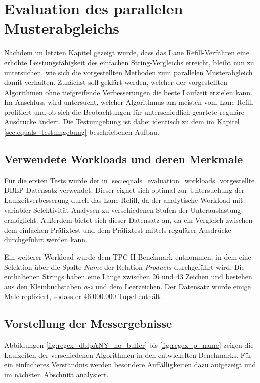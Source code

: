 \chapter{Evaluation des parallelen Musterabgleichs}

Nachdem im letzten Kapitel gezeigt wurde, dass das Lane Refill-Verfahren eine erhöhte Leistungsfähigkeit des einfachen String-Vergleichs erreicht, bleibt nun zu untersuchen, wie sich die vorgestellten Methoden zum parallelen Musterabgleich damit verhalten.
Zunächst soll geklärt werden, welcher der vorgestellten Algorithmen ohne tiefgreifende Verbesserungen die beste Laufzeit erzielen kann.
Im Anschluss wird untersucht, welcher Algorithmus am meisten vom Lane Refill profitiert und ob sich die Beobachtungen für unterschiedlich geartete reguläre Ausdrücke ändert.
Die Testumgebung ist dabei identisch zu dem im Kapitel \ref{sec:equals_testumgebung} beschriebenen Aufbau.

\section{Verwendete Workloads und deren Merkmale}

Für die ersten Tests wurde der in \ref{sec:equals_evaluation_workloads} vorgestellte DBLP-Datensatz verwendet.
Dieser eignet sich optimal zur Untersuchung der Laufzeitverbesserung durch das Lane Refill, da der analytische Workload mit variabler Selektivität Analysen zu verschiedenen Stufen der Unterauslastung ermöglicht.
Außerdem bietet sich dieser Datensatz an, da ein Vergleich zwischen dem einfachen Präfixtest und dem Präfixtest mittels regulärer Ausdrücke durchgeführt werden kann.

Ein weiterer Workload wurde dem TPC-H-Benchmark entnommen, in dem eine Selektion über die Spalte \emph{Name} der Relation \emph{Products} durchgeführt wird.
Die enthaltenen Strings haben eine Länge zwischen 26 und 43 Zeichen und bestehen aus den Kleinbuchstaben \emph{a-z} und dem Leerzeichen.
Der Datensatz wurde einige Male repliziert, sodass er 46.000.000 Tupel enthält.

\section{Vorstellung der Messergebnisse}

Abbildungen \ref{fig:regex_dblpANY_no_buffer} bis \ref{fig:regex_p_name} zeigen die Laufzeiten der verschiedenen Algorithmen in den entwickelten Benchmarks.
Für ein einfacheres Verständnis werden besondere Auffälligkeiten dazu aufgezeigt und im nächsten Abschnitt analysiert.

